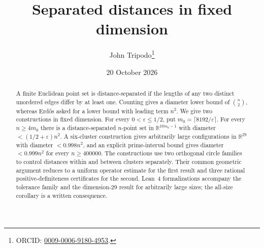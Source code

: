 \documentclass[11pt]{article}
\title{Separated distances in fixed dimension}
\author{John Tripodo\thanks{ORCID: \href{https://orcid.org/0009-0006-9180-4953}{0009-0006-9180-4953}.}}
\date{20 October 2026}
\numberwithin{equation}{section}
\theoremstyle{definition}\newtheorem{definition}[theorem]{Definition}
\theoremstyle{remark}\newtheorem{remark}[theorem]{Remark}
\newcommand{\R}{\mathbb R}\newcommand{\N}{\mathbb N}
\begin{document}
\maketitle

\begin{abstract}
A finite Euclidean point set is distance-separated if the lengths of any
two distinct unordered edges differ by at least one. Counting gives a
diameter lower bound of $\binom n2$, whereas Erd\H{o}s asked for a lower
bound with leading term $n^2$. We give two constructions in fixed dimension.
For every $0<\varepsilon\le1/2$, put $m_0=\lceil8192/\varepsilon\rceil$.
For every $n\ge4m_0$ there is a distance-separated $n$-point set in
$\R^{10m_0-1}$ with diameter $<(1/2+\varepsilon)n^2$.
A six-cluster construction gives arbitrarily large configurations in
$\R^{29}$ with diameter $<0.998n^2$, and an explicit prime-interval bound
gives diameter $<0.999n^2$ for every $n\ge400000$.
The constructions use two orthogonal circle families to control distances
within and between clusters separately. Their common geometric argument
reduces to a uniform operator estimate for the first result and three
rational positive-definiteness certificates for the second.
Lean~4 formalizations accompany the tolerance family and the
dimension-29 result for arbitrarily large sizes; the all-size corollary is a
written consequence.
\end{abstract}

\medskip
\end{document}
